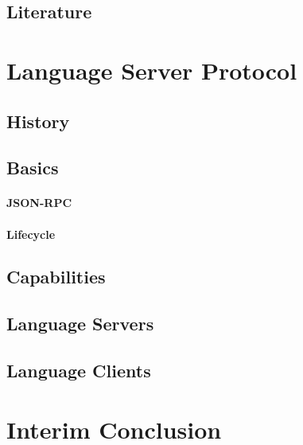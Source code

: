 \documentclass[../thesis]{subfiles}
\begin{document}

\subsection{Literature}
\fxfatal{}

\section{Language Server Protocol}\label{sec:lsp}
\fxfatal{}

\subsection{History}
\fxfatal{}

\subsection{Basics}
\fxfatal{}

\paragraph{JSON-RPC}
\fxfatal{}

\paragraph{Lifecycle}
\fxfatal{}

\subsection{Capabilities}
\fxfatal{}


\subsection{Language Servers}
\fxfatal{}


\subsection{Language Clients}
\fxfatal{}

\section{Interim Conclusion}  %
\fxfatal{}
\end{document}
